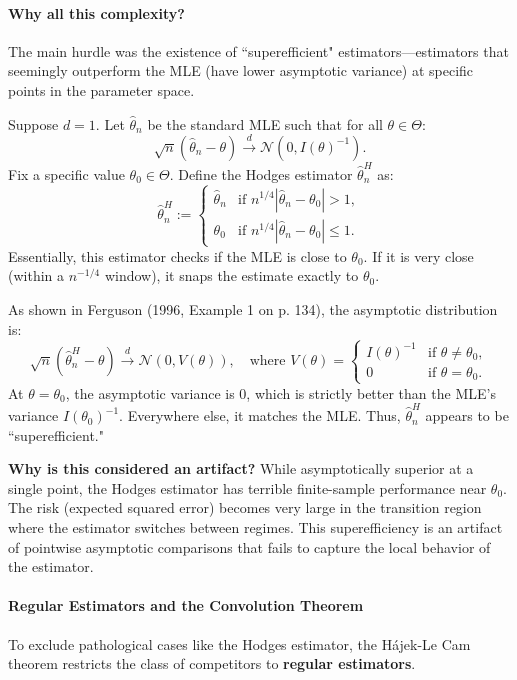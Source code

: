 \paragraph{Why all this complexity?}
The main hurdle was the existence of ``superefficient" estimators—estimators that seemingly outperform the MLE (have lower asymptotic variance) at specific points in the parameter space.

\medskip

\begin{ex}
Suppose $d = 1$. Let $\hat{\theta}_n$ be the standard MLE such that for all $\theta \in \Theta$:
\[
\sqrt{n}(\hat{\theta}_n - \theta) \xrightarrow{d} \mathcal{N}(0, I(\theta)^{-1}).
\]
Fix a specific value $\theta_0 \in \Theta$. Define the Hodges estimator $\hat{\theta}_n^H$ as:
\[
\hat{\theta}_n^H := \begin{cases} 
\hat{\theta}_n & \text{if } n^{1/4} | \hat{\theta}_n - \theta_0 | > 1, \\ 
\theta_0 & \text{if } n^{1/4} | \hat{\theta}_n - \theta_0 | \leq 1. 
\end{cases}
\]
Essentially, this estimator checks if the MLE is close to $\theta_0$. If it is very close (within a $n^{-1/4}$ window), it snaps the estimate exactly to $\theta_0$.

As shown in Ferguson (1996, Example 1 on p. 134), the asymptotic distribution is:
\[
\sqrt{n}(\hat{\theta}_n^H - \theta) \xrightarrow{d} \mathcal{N}(0, V(\theta)), 
\quad \text{where } V(\theta) = \begin{cases} 
I(\theta)^{-1} & \text{if } \theta \neq \theta_0, \\ 
0 & \text{if } \theta = \theta_0. 
\end{cases}
\]
At $\theta = \theta_0$, the asymptotic variance is 0, which is strictly better than the MLE's variance $I(\theta_0)^{-1}$. Everywhere else, it matches the MLE. Thus, $\hat{\theta}_n^H$ appears to be ``superefficient."

\textbf{Why is this considered an artifact?}
While asymptotically superior at a single point, the Hodges estimator has terrible finite-sample performance near $\theta_0$. The risk (expected squared error) becomes very large in the transition region where the estimator switches between regimes. This superefficiency is an artifact of pointwise asymptotic comparisons that fails to capture the local behavior of the estimator.
\end{ex}

\paragraph{Regular Estimators and the Convolution Theorem}
To exclude pathological cases like the Hodges estimator, the Hájek-Le Cam theorem restricts the class of competitors to \textbf{regular estimators}.

